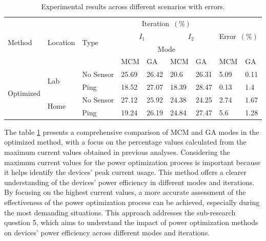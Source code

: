 \begin{longtable}{lllllllll}
  \label{tab:experimental_results}\\
  \caption{Experimental results across different scenarios with errors.}\\
  \hline\hline
  \multirow{4}{*}{Method}    & \multirow{4}{*}{Location} & \multirow{4}{*}{Type} & \multicolumn{4}{c}{Iteration~$(\%)$}                  & \multicolumn{2}{l}{\multirow{3}{*}{Error~$(\%)$}} \\*
  \cline{4-7}
                             &                           &                       & \multicolumn{2}{c}{$I_1$} & \multicolumn{2}{c}{$I_2$} & \multicolumn{2}{l}{}                              \\*
  \cline{4-7}
                             &                           &                       & \multicolumn{4}{c}{Mode}                              & \multicolumn{2}{l}{}                              \\*
  \cline{4-9}
                             &                           &                       & MCM   & GA                & MCM   & GA                & MCM  & GA                                         \\*
  \hline
  \multirow{4}{*}{Optimized} & \multirow{2}{*}{Lab}      & No Sensor             & 25.69 & 26.42             & 20.6  & 26.31             & 5.09 & 0.11                                       \\*
                             &                           & Ping                  & 18.52 & 27.07             & 18.39 & 28.47             & 0.13 & 1.4                                        \\*
  \cline{2-9}
                             & \multirow{2}{*}{Home}     & No Sensor             & 27.12 & 25.92             & 24.38 & 24.25             & 2.74 & 1.67                                       \\*
                             &                           & Ping                  & 19.24 & 26.19             & 24.84 & 27.47             & 5.6  & 1.28                                       \\
  \hline\hline
\end{longtable}

The table \ref{tab:experimental_results} presents a comprehensive comparison of \gls{MCM} and \gls{GA} modes in the optimized method, with a focus on the percentage values calculated from the maximum current values obtained in previous analyses. Considering the maximum current values for the power optimization process is important because it helps identify the devices' peak current usage. This method offers a clearer understanding of the devices' power efficiency in different modes and iterations. By focusing on the highest current values, a more accurate assessment of the effectiveness of the power optimization process can be achieved, especially during the most demanding situations. This approach addresses the sub-research question 5, which aims to understand the impact of power optimization methods on devices' power efficiency across different modes and iterations.

